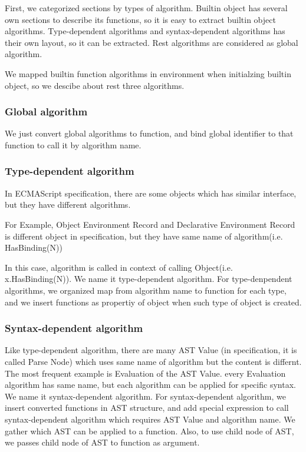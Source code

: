   First, we categorized sections by types of algorithm. Builtin object has several own sections to describe its functions,
so it is easy to extract builtin object algorithms. Type-dependent algorithms and syntax-dependent algorithms has their own layout, so it
can be extracted. Rest algorithms are considered as global algorithm.

We mapped builtin function algorithms in environment when initialzing builtin object, so we descibe about rest three algorithms. 

\subsubsection{Global algorithm}

We just convert global algorithms to function, and bind global identifier to that function to call it by algorithm name.

\subsubsection{Type-dependent algorithm}

In ECMAScript specification, there are some objects which has similar interface, but they have different algorithms. 

For Example, Object Environment Record and Declarative Environment Record is different object in specification, but they have same name of algorithm(i.e. HasBinding(N))

In this case, algorithm is called in context of calling Object(i.e. x.HasBinding(N)). We name it type-dependent algorithm.
For type-denpendent algorithms, we organized map from algorithm name to function for each type,
 and we insert functions as propertiy of object when such type of object is created.

 \subsubsection{Syntax-dependent algorithm}
 
 Like type-dependent algorithm, there are many AST Value (in specification, it is called Parse Node) which uses same name of algorithm but the content is differnt.
The most frequent example is Evaluation of the AST Value. every Evaluation algorithm has same name, but each algorithm can be applied for specific syntax. We name it syntax-dependent algorithm.
For syntax-dependent algorithm, we insert converted functions in AST structure, and add special expression to call syntax-dependent algorithm which requires AST Value and algorithm name.
We gather which AST can be applied to a function. Also, to use child node of AST, we passes child node of AST to function as argument.


